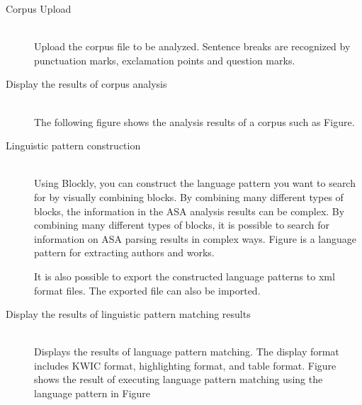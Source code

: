 \begin{description}
   \item[Corpus Upload]\mbox{}\\
Upload the corpus file to be analyzed. Sentence breaks are recognized by punctuation marks, exclamation points
and question marks.
   \item[Display the  results of corpus analysis]\mbox{}\\
The following figure shows the analysis results of a corpus such as Figure.



\item[Linguistic pattern construction]\mbox{}\\
Using Blockly, you can construct the language pattern you want to search for by visually combining blocks.
By combining many different types of blocks, the information in the ASA analysis results can be complex. By combining many different types of blocks, it is possible to search for information on ASA parsing results in complex ways.
Figure is a language pattern for extracting authors and works.



It is also possible to export the constructed language patterns to xml format files.
The exported file can also be imported.
\item[Display the results of linguistic pattern matching results]\mbox{}\\

Displays the results of language pattern matching. The display format includes KWIC format, highlighting format, and
table format. Figure  shows the result of executing language pattern matching using the language pattern in Figure 

\end{description}





